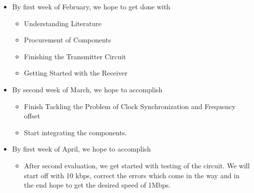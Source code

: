 \documentclass{article}
\begin{document}
\begin{itemize}
\item By first week of February, we hope to get done with
  \begin{itemize}
  \item Understanding Literature
  \item Procurement of Components
  \item Finishing the Transmitter Circuit
  \item Getting Started with the Receiver 
  \end{itemize}

\item By second week of March, we hope to accomplish

  \begin{itemize}
  \item Finish Tackling the Problem of Clock Synchronization and Frequency offset
  \item Start integrating the components.
  \end{itemize}

\item By first week of April, we hope to accomplish
  \begin{itemize}
  \item After second evaluation, we get started with testing of the circuit. We will start off with 10 kbps, correct the errors which come in the way and in the end   hope to get the desired speed of 1Mbps. 
  \end{itemize}
\end{itemize}
\end{document}

